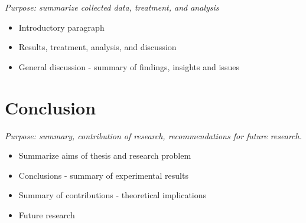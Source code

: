 \emph{Purpose: summarize collected data, treatment, and analysis}

\begin{itemize}
\item Introductory paragraph

\item Results, treatment, analysis, and discussion

\item General discussion - summary of findings, insights and issues

\end{itemize}

\section{Conclusion}
\label{conclusion}

\emph{Purpose: summary, contribution of research, recommendations for future research.}

\begin{itemize}
\item Summarize aims of thesis and research problem

\item Conclusions - summary of experimental results

\item Summary of contributions - theoretical implications

\item Future research

\end{itemize}

